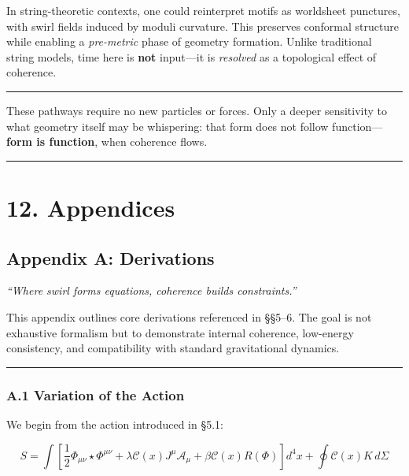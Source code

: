 \documentclass[
  11pt,
]{article}
\begin{document}
In string-theoretic contexts, one could reinterpret motifs as worldsheet
punctures, with swirl fields induced by moduli curvature. This preserves
conformal structure while enabling a \emph{pre-metric} phase of geometry
formation. Unlike traditional string models, time here is \textbf{not}
input---it is \emph{resolved} as a topological effect of coherence.

\begin{center}\rule{0.5\linewidth}{0.5pt}\end{center}

These pathways require no new particles or forces. Only a deeper
sensitivity to what geometry itself may be whispering: that form does
not follow function---\textbf{form is function}, when coherence flows.

\begin{center}\rule{0.5\linewidth}{0.5pt}\end{center}

\section{12. Appendices}\label{appendices}

\subsection{Appendix A: Derivations}\label{appendix-a-derivations}

\emph{``Where swirl forms equations, coherence builds constraints.''}

This appendix outlines core derivations referenced in §§5--6. The goal
is not exhaustive formalism but to demonstrate internal coherence,
low-energy consistency, and compatibility with standard gravitational
dynamics.

\begin{center}\rule{0.5\linewidth}{0.5pt}\end{center}

\subsubsection{A.1 Variation of the
Action}\label{a.1-variation-of-the-action}

We begin from the action introduced in §5.1:

\[
S = \int \left[ \frac{1}{2} \Phi_{\mu\nu} \star \Phi^{\mu\nu} + \lambda \mathcal{C}(x) J^\mu \mathcal{A}_\mu + \beta \mathcal{C}(x) R(\Phi) \right] d^4x + \oint \mathcal{C}(x) K \, d\Sigma
\]
\end{document}
